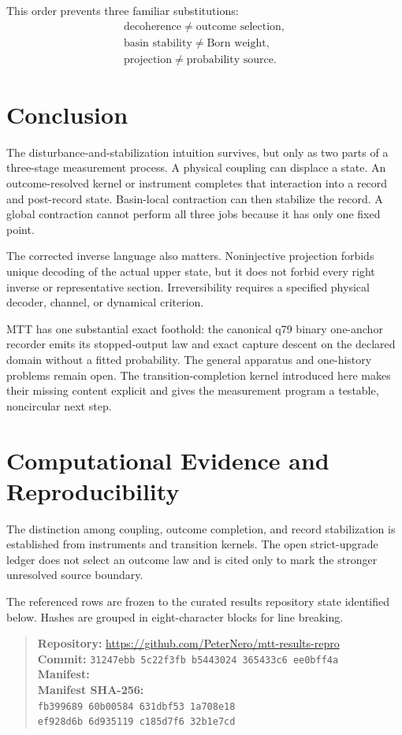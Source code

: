 \documentclass[11pt,a4paper]{article}
\theoremstyle{definition}
\theoremstyle{remark}
\begin{document}
This order prevents three familiar substitutions:
\[
\begin{gathered}
\text{decoherence}\neq\text{outcome selection},\\
\text{basin stability}\neq\text{Born weight},\\
\text{projection}\neq\text{probability source}.
\end{gathered}
\]

\section{Conclusion}

The disturbance-and-stabilization intuition survives, but only as two parts of
a three-stage measurement process. A physical coupling can displace a state.
An outcome-resolved kernel or instrument completes that interaction into a
record and post-record state. Basin-local contraction can then stabilize the
record. A global contraction cannot perform all three jobs because it has only
one fixed point.

The corrected inverse language also matters. Noninjective projection forbids
unique decoding of the actual upper state, but it does not forbid every right
inverse or representative section. Irreversibility requires a specified
physical decoder, channel, or dynamical criterion.

MTT has one substantial exact foothold: the canonical q79 binary one-anchor
recorder emits its stopped-output law and exact capture descent on the declared
domain without a fitted probability. The general apparatus and one-history
problems remain open. The transition-completion kernel introduced here makes
their missing content explicit and gives the measurement program a testable,
noncircular next step.

\section*{Computational Evidence and Reproducibility}
The distinction among coupling, outcome completion, and record stabilization is established from instruments and transition kernels. The open strict-upgrade ledger does not select an outcome law and is cited only to mark the stronger unresolved source boundary.

The referenced rows are frozen to the curated results repository state identified below. Hashes are grouped in eight-character blocks for line breaking.
\begin{quote}\small
\textbf{Repository:} \url{https://github.com/PeterNero/mtt-results-repro}\\
\textbf{Commit:} \texttt{31247ebb 5c22f3fb b5443024 365433c6 ee0bff4a}\\
\textbf{Manifest:} \\
\textbf{Manifest SHA-256:}\\
\texttt{fb399689 60b00584 631dbf53 1a708e18}\\
\texttt{ef928d6b 6d935119 c185d7f6 32b1e7cd}
\end{quote}
\end{document}
